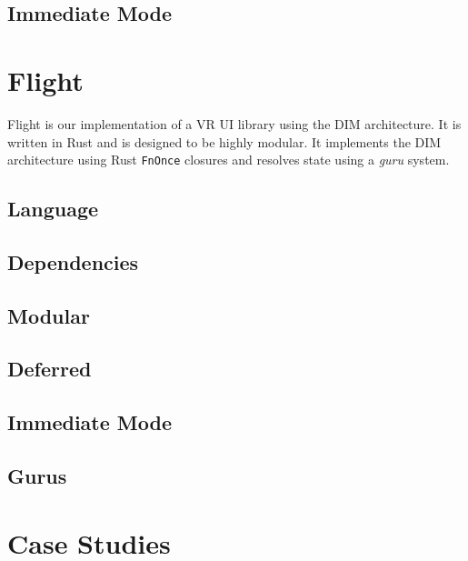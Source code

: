 \documentclass[conference,12pt]{IEEEtran}
\begin{document}
\subsection{Immediate Mode}

\section{Flight}
Flight is our implementation of a VR UI library using the DIM architecture. It
is written in Rust and is designed to be highly modular. It implements the DIM
architecture using Rust \texttt{FnOnce} closures and resolves state using a
\textit{guru} system.

\subsection{Language}

\subsection{Dependencies}

\subsection{Modular}

\subsection{Deferred}

\subsection{Immediate Mode}

\subsection{Gurus} %


\section{Case Studies}
\end{document}
